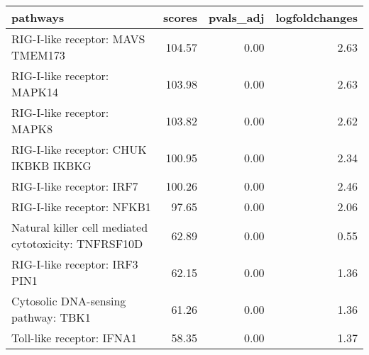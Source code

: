 \begin{tabular}{lrrr}
\toprule
pathways & scores & pvals\_adj & logfoldchanges \\
\midrule
RIG-I-like receptor: MAVS TMEM173 & 104.57 & 0.00 & 2.63 \\
RIG-I-like receptor: MAPK14 & 103.98 & 0.00 & 2.63 \\
RIG-I-like receptor: MAPK8 & 103.82 & 0.00 & 2.62 \\
RIG-I-like receptor: CHUK IKBKB IKBKG & 100.95 & 0.00 & 2.34 \\
RIG-I-like receptor: IRF7 & 100.26 & 0.00 & 2.46 \\
RIG-I-like receptor: NFKB1 & 97.65 & 0.00 & 2.06 \\
Natural killer cell mediated cytotoxicity: TNFRSF10D & 62.89 & 0.00 & 0.55 \\
RIG-I-like receptor: IRF3 PIN1 & 62.15 & 0.00 & 1.36 \\
Cytosolic DNA-sensing pathway: TBK1 & 61.26 & 0.00 & 1.36 \\
Toll-like receptor: IFNA1 & 58.35 & 0.00 & 1.37 \\
\bottomrule
\end{tabular}
